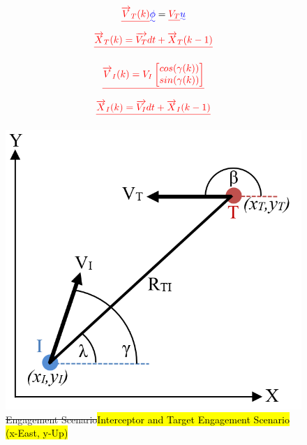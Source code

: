 \documentclass[conference]{IEEEtran}
\providecommand{\DIFadd}[1]{{\protect\color{blue}\uwave{#1}}} %
\providecommand{\DIFdel}[1]{{\protect\color{red}\sout{#1}}}                      %
\providecommand{\DIFaddbegin}{} %
\providecommand{\DIFaddend}{} %
\providecommand{\DIFdelbegin}{} %
\providecommand{\DIFdelend}{} %
\providecommand{\DIFdelFL}[1]{\DIFdel{#1}} %
\providecommand{\DIFaddbeginFL}{} %
\providecommand{\DIFaddendFL}{} %
\providecommand{\DIFdelbeginFL}{} %
\providecommand{\DIFdelendFL}{} %
\newcommand{\DIFscaledelfig}{0.5}
\newlength{\DIFdelgraphicswidth} %
\newlength{\DIFdelgraphicsheight} %
\newcommand{\DIFaddincludegraphics}[2][]{{\color{blue}\fbox{\DIFOincludegraphics[#1]{#2}}}} %
\newcommand{\DIFdelincludegraphics}[2][]{%
\sbox{\DIFdelgraphicsbox}{\DIFOincludegraphics[#1]{#2}}%
\settoboxwidth{\DIFdelgraphicswidth}{\DIFdelgraphicsbox} %
\settoboxtotalheight{\DIFdelgraphicsheight}{\DIFdelgraphicsbox} %
\scalebox{\DIFscaledelfig}{%
\parbox[b]{\DIFdelgraphicswidth}{\usebox{\DIFdelgraphicsbox}\\[-\baselineskip] \rule{\DIFdelgraphicswidth}{0em}}\llap{\resizebox{\DIFdelgraphicswidth}{\DIFdelgraphicsheight}{%
\setlength{\unitlength}{\DIFdelgraphicswidth}%
\begin{picture}(1,1)%
\thicklines\linethickness{2pt} %
{\color[rgb]{1,0,0}\put(0,0){\framebox(1,1){}}}%
{\color[rgb]{1,0,0}\put(0,0){\line( 1,1){1}}}%
{\color[rgb]{1,0,0}\put(0,1){\line(1,-1){1}}}%
\end{picture}%
}\hspace*{3pt}}} %
} %
\DeclareRobustCommand{\DIFaddbegin}{\DIFOaddbegin \let\includegraphics\DIFaddincludegraphics} %
\DeclareRobustCommand{\DIFaddend}{\DIFOaddend \let\includegraphics\DIFOincludegraphics} %
\DeclareRobustCommand{\DIFdelbegin}{\DIFOdelbegin \let\includegraphics\DIFdelincludegraphics} %
\DeclareRobustCommand{\DIFdelend}{\DIFOaddend \let\includegraphics\DIFOincludegraphics} %
\DeclareRobustCommand{\DIFaddbeginFL}{\DIFOaddbeginFL \let\includegraphics\DIFaddincludegraphics} %
\DeclareRobustCommand{\DIFaddendFL}{\DIFOaddendFL \let\includegraphics\DIFOincludegraphics} %
\DeclareRobustCommand{\DIFdelbeginFL}{\DIFOdelbeginFL \let\includegraphics\DIFdelincludegraphics} %
\DeclareRobustCommand{\DIFdelendFL}{\DIFOaddendFL \let\includegraphics\DIFOincludegraphics} %
\begin{document}
\begin{equation}\DIFdelbegin %
\DIFdel{\overrightarrow{V}_{T}(k) }\DIFdelend \DIFaddbegin \label{eq:dubinsVel}
\DIFadd{\phi }\DIFaddend = \DIFdelbegin \DIFdel{V_{T} }%
\DIFdelend \DIFaddbegin \DIFadd{u
}\DIFaddend \end{equation}
 \DIFdelbegin \begin{displaymath}\DIFdel{%
\overrightarrow{X}_T(k) =  \overrightarrow{V_T}dt + \overrightarrow{X}_T(k-1) 
}\end{displaymath}
\DIFdelend 


\DIFdelbegin \begin{displaymath}\DIFdel{%
\overrightarrow{V}_{I}(k) =  V_{I} \begin{bmatrix} cos(\gamma(k)) \\ sin(\gamma(k)) \end{bmatrix}
}\end{displaymath}
\begin{displaymath}\DIFdel{%
\overrightarrow{X}_I(k) =  \overrightarrow{V_I}dt + \overrightarrow{X}_I(k-1) 
}\end{displaymath}


\DIFdelend \begin{figure}[H]
	\centering
	\includegraphics[width=6 cm]{Engagement_Model.PNG}
	\caption{\DIFdelbeginFL \DIFdelFL{Engagement Scenario}\DIFdelendFL \DIFaddbeginFL \hl{Interceptor and Target Engagement Scenario (x-East, y-Up)}\DIFaddendFL }
	\label{fig:Egagement}
\end{figure}
\end{document}
